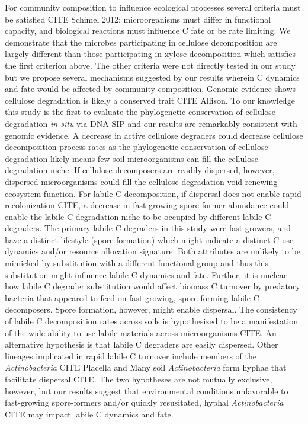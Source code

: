 For community composition to influence ecological processes several criteria
must be satisfied CITE Schimel 2012: microorganisms must differ in functional
capacity, and biological reactions must influence C fate or be rate limiting.
We demonstrate that the microbes participating in cellulose decomposition are
largely different than those participating in xylose decomposition which
satisfies the first criterion above. The other criteria were not directly
tested in our study but we propose several mechanisms suggested by our results
wherein C dynamics and fate would be affected by community composition. Genomic
evidence shows cellulose degradation is likely a conserved trait CITE Allison.
To our knowledge this study is the first to evaluate the phylogenetic
conservation of cellulose degradation \textit{in situ} via DNA-SIP and our
results are remarkably consistent with genomic evidence. A decrease in active
cellulose degraders could decrease cellulose decomposition process rates as the
phylogenetic conservation of cellulose degradation likely means few soil
microorganisms can fill the cellulose degradation niche. If cellulose
decomposers are readily dispersed, however, dispersed microorganisms could fill
the cellulose degradation void renewing ecosystem function. For labile
C decomposition, if dispersal does not enable rapid recolonization CITE,
a decrease in fast growing spore former abundance could enable the labile
C degradation niche to be occupied by different labile C degraders. The primary
labile C degraders in this study were fast growers, and have a distinct
lifestyle (spore formation) which might indicate a distinct C use dynamics
and/or resource allocation signature. Both attributes are unlikely to be
mimicked by substitution with a different functional group and thus this
substitution might influence labile C dynamics and fate. Further, it is unclear
how labile C degrader substitution would affect biomass C turnover by predatory
bacteria that appeared to feed on fast growing, spore forming labile
C decomposers. Spore formation, however, might enable dispersal. The
consistency of labile C decomposition rates across soils is hypothesized to be
a manifestation of the wide ability to use labile materials across
microorganisms CITE. An alternative hypothesis is that labile C degraders are
easily dispersed. Other lineages implicated in rapid labile C turnover include
members of the \textit{Actinobacteria} CITE Placella and Many soil
\textit{Actinobacteria} form hyphae that facilitate dispersal CITE. The two
hypotheses are not mutually exclusive, however, but our results suggest that
environmental conditions unfavorable to fast-growing spore-formers and/or
quickly resusitated, hyphal \textit{Actinobacteria} CITE may impact labile
C dynamics and fate.

